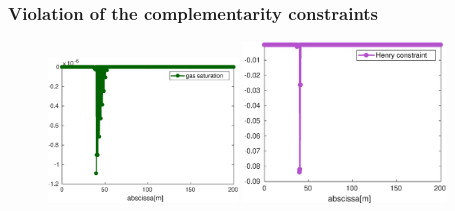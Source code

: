 \documentclass[10 pt]{beamer}
\begin{document}
\begin{frame}
 \frametitle{Violation of the complementarity constraints}
\begin{figure}
\centering
\includegraphics[width=0.45\textwidth]{image/gas_saturation_neg_gmres_iter2_newtoninter_4} \qquad
\includegraphics[width=0.48\textwidth]{image/henry_constraint_neg_gmresiter2_newton_iter4}
\end{figure}
\end{frame}
%
\end{document}
